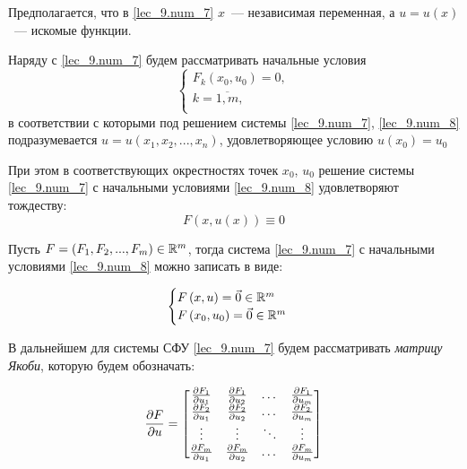 \documentclass[../../main.tex]{subfiles}
\begin{document}
Предполагается, что в \eqref{lec_9.num_7} $x$~--- независимая
переменная, а $u = u\left(x\right)$~--- искомые функции.

Наряду с \eqref{lec_9.num_7} будем рассматривать начальные условия
\begin{equation}
    \label{lec_9.num_8}
    \begin{cases}
        F_k\left(x_0, u_0\right) = 0, \\
        k = \overline{1, m}, \\
    \end{cases}
\end{equation}
в соответствии с которыми под решением системы
\eqref{lec_9.num_7}, \eqref{lec_9.num_8}
подразумевается $u = u(x_1, x_2, ..., x_n)$,
удовлетворяющее условию
$u\left(x_0\right) = u_0$

При этом в соответствующих окрестностях точек $x_0$, $u_0$
решение системы \eqref{lec_9.num_7}
с начальными условиями 
\eqref{lec_9.num_8} удовлетворяют тождеству:
\[F(x, u(x)) \equiv 0\]

Пусть $F = \left(F_1, F_2, ...,F_m\right) \in \mathbb{R}^m$,
тогда система \eqref{lec_9.num_7}
с начальными условиями 
\eqref{lec_9.num_8} можно записать в виде:

\begin{equation}
    \label{lec_9.num_9}
    \begin{cases}
     F\left(x, u\right) = \vec{0} \in \mathbb{R}^m\\
     F\left(x_0, u_0\right) = \vec{0} \in \mathbb{R}^m\\
    \end{cases}
\end{equation}


В дальнейшем для системы СФУ \eqref{lec_9.num_7} 
будем рассматривать \emph{матрицу Якоби}, которую будем обозначать:

\begin{equation}
    \label{lec_9.num_10}
    \frac{\partial F}{\partial u} =
    \begin{bmatrix}
        \frac{\partial F_1}{\partial u_1} & \frac{\partial F_1}{\partial u_2} & \dots & 
        \frac{\partial F_1}{\partial u_m} \\
        \frac{\partial F_2}{\partial u_1} & \frac{\partial F_2}{\partial u_2} &\dots & 
        \frac{\partial F_2}{\partial u_m} \\
        \vdots & \vdots & \ddots & \vdots \\
        \frac{\partial F_m}{\partial u_1} & \frac{\partial F_m}{\partial u_2} & \dots & 
        \frac{\partial F_m}{\partial u_m}
    \end{bmatrix}
\end{equation}
\end{document}
